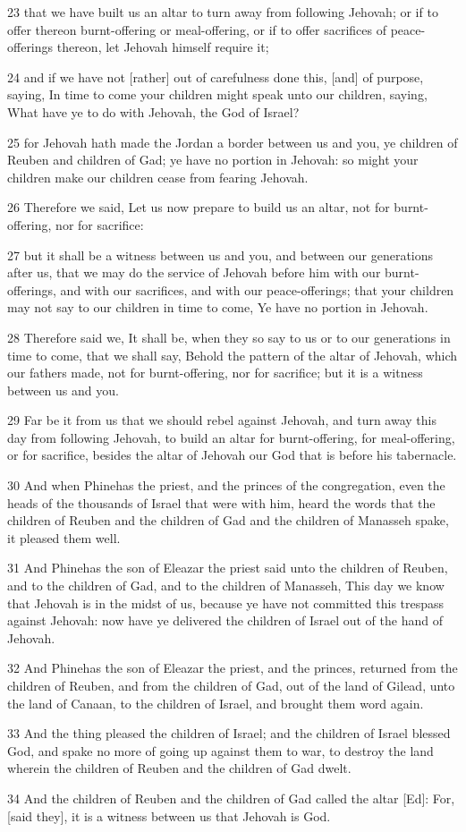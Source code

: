 \par 23 that we have built us an altar to turn away from following Jehovah; or if to offer thereon burnt-offering or meal-offering, or if to offer sacrifices of peace-offerings thereon, let Jehovah himself require it;
\par 24 and if we have not [rather] out of carefulness done this, [and] of purpose, saying, In time to come your children might speak unto our children, saying, What have ye to do with Jehovah, the God of Israel?
\par 25 for Jehovah hath made the Jordan a border between us and you, ye children of Reuben and children of Gad; ye have no portion in Jehovah: so might your children make our children cease from fearing Jehovah.
\par 26 Therefore we said, Let us now prepare to build us an altar, not for burnt-offering, nor for sacrifice:
\par 27 but it shall be a witness between us and you, and between our generations after us, that we may do the service of Jehovah before him with our burnt-offerings, and with our sacrifices, and with our peace-offerings; that your children may not say to our children in time to come, Ye have no portion in Jehovah.
\par 28 Therefore said we, It shall be, when they so say to us or to our generations in time to come, that we shall say, Behold the pattern of the altar of Jehovah, which our fathers made, not for burnt-offering, nor for sacrifice; but it is a witness between us and you.
\par 29 Far be it from us that we should rebel against Jehovah, and turn away this day from following Jehovah, to build an altar for burnt-offering, for meal-offering, or for sacrifice, besides the altar of Jehovah our God that is before his tabernacle.
\par 30 And when Phinehas the priest, and the princes of the congregation, even the heads of the thousands of Israel that were with him, heard the words that the children of Reuben and the children of Gad and the children of Manasseh spake, it pleased them well.
\par 31 And Phinehas the son of Eleazar the priest said unto the children of Reuben, and to the children of Gad, and to the children of Manasseh, This day we know that Jehovah is in the midst of us, because ye have not committed this trespass against Jehovah: now have ye delivered the children of Israel out of the hand of Jehovah.
\par 32 And Phinehas the son of Eleazar the priest, and the princes, returned from the children of Reuben, and from the children of Gad, out of the land of Gilead, unto the land of Canaan, to the children of Israel, and brought them word again.
\par 33 And the thing pleased the children of Israel; and the children of Israel blessed God, and spake no more of going up against them to war, to destroy the land wherein the children of Reuben and the children of Gad dwelt.
\par 34 And the children of Reuben and the children of Gad called the altar [Ed]: For, [said they], it is a witness between us that Jehovah is God.

